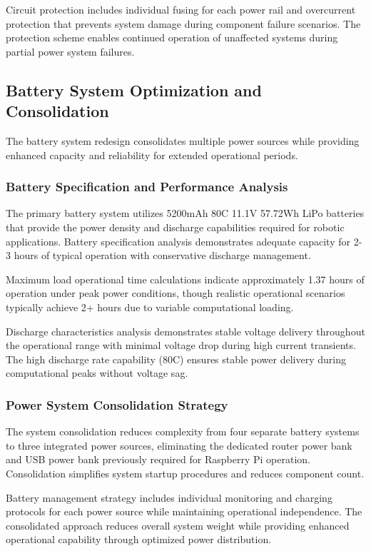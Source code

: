 Circuit protection includes individual fusing for each power rail and overcurrent protection that prevents system damage during component failure scenarios. The protection scheme enables continued operation of unaffected systems during partial power system failures.

\subsection{Battery System Optimization and Consolidation}

The battery system redesign consolidates multiple power sources while providing enhanced capacity and reliability for extended operational periods.

\subsubsection{Battery Specification and Performance Analysis}

The primary battery system utilizes 5200mAh 80C 11.1V 57.72Wh LiPo batteries that provide the power density and discharge capabilities required for robotic applications. Battery specification analysis demonstrates adequate capacity for 2-3 hours of typical operation with conservative discharge management.

Maximum load operational time calculations indicate approximately 1.37 hours of operation under peak power conditions, though realistic operational scenarios typically achieve 2+ hours due to variable computational loading.

Discharge characteristics analysis demonstrates stable voltage delivery throughout the operational range with minimal voltage drop during high current transients. The high discharge rate capability (80C) ensures stable power delivery during computational peaks without voltage sag.

\subsubsection{Power System Consolidation Strategy}

The system consolidation reduces complexity from four separate battery systems to three integrated power sources, eliminating the dedicated router power bank and USB power bank previously required for Raspberry Pi operation. Consolidation simplifies system startup procedures and reduces component count.

Battery management strategy includes individual monitoring and charging protocols for each power source while maintaining operational independence. The consolidated approach reduces overall system weight while providing enhanced operational capability through optimized power distribution.


